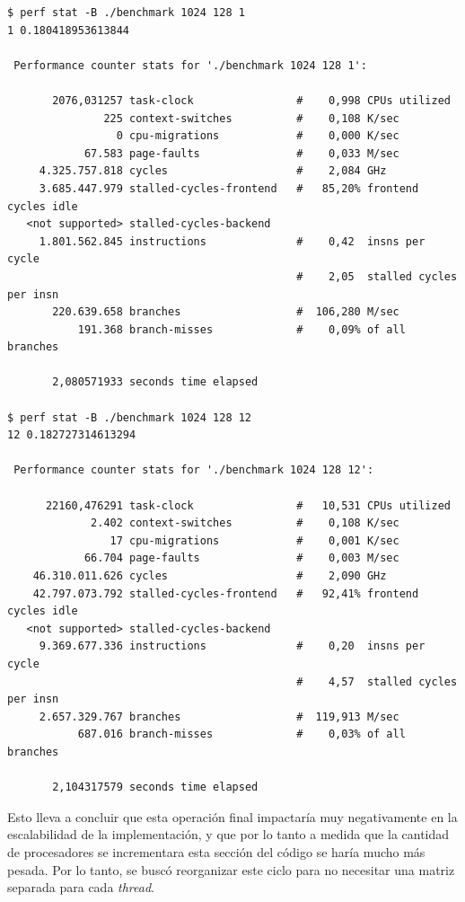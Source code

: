 {\footnotesize
\begin{verbatim}
$ perf stat -B ./benchmark 1024 128 1
1 0.180418953613844

 Performance counter stats for './benchmark 1024 128 1':

       2076,031257 task-clock                #    0,998 CPUs utilized
               225 context-switches          #    0,108 K/sec
                 0 cpu-migrations            #    0,000 K/sec
            67.583 page-faults               #    0,033 M/sec
     4.325.757.818 cycles                    #    2,084 GHz
     3.685.447.979 stalled-cycles-frontend   #   85,20% frontend cycles idle
   <not supported> stalled-cycles-backend
     1.801.562.845 instructions              #    0,42  insns per cycle
                                             #    2,05  stalled cycles per insn
       220.639.658 branches                  #  106,280 M/sec
           191.368 branch-misses             #    0,09% of all branches

       2,080571933 seconds time elapsed

$ perf stat -B ./benchmark 1024 128 12
12 0.182727314613294

 Performance counter stats for './benchmark 1024 128 12':

      22160,476291 task-clock                #   10,531 CPUs utilized
             2.402 context-switches          #    0,108 K/sec
                17 cpu-migrations            #    0,001 K/sec
            66.704 page-faults               #    0,003 M/sec
    46.310.011.626 cycles                    #    2,090 GHz
    42.797.073.792 stalled-cycles-frontend   #   92,41% frontend cycles idle
   <not supported> stalled-cycles-backend
     9.369.677.336 instructions              #    0,20  insns per cycle
                                             #    4,57  stalled cycles per insn
     2.657.329.767 branches                  #  119,913 M/sec
           687.016 branch-misses             #    0,03% of all branches

       2,104317579 seconds time elapsed
\end{verbatim}
}

Esto lleva a concluir que esta operaci\'on final impactar\'ia muy
negativamente en la escalabilidad de la implementaci\'on, y que por lo tanto a
medida que la cantidad de procesadores se incrementara esta secci\'on del
c\'odigo se har\'ia mucho m\'as pesada. Por lo tanto, se busc\'o reorganizar
este ciclo para no necesitar una matriz separada para cada \textit{thread}.

